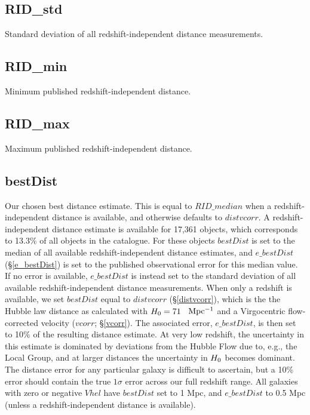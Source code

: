 \subsection{RID\_std} \label{RID_std}
Standard deviation of all redshift-independent distance measurements.

\subsection{RID\_min} \label{RID_min}
Minimum published redshift-independent distance.

\subsection{RID\_max} \label{RID_max}
Maximum published redshift-independent distance.

\subsection{bestDist} \label{bestDist}
Our chosen best distance estimate. This is equal to $RID\_median$ when a redshift-independent distance is available, and otherwise defaults to $distvcorr$. A redshift-independent distance estimate is available for 17,361 objects, which corresponds to 13.3\% of all objects in the catalogue. For these objects $bestDist$ is set to the median of all available redshift-independent distance estimates, and $e\_bestDist$ (\S \ref{e_bestDist}) is set to the published observational error for this median value. If no error is available, $e\_bestDist$ is instead set to the standard deviation of all available redshift-independent distance measurements. When only a redshift is available, we set $bestDist$ equal to $distvcorr$ (\S \ref{distvcorr}), which is the the Hubble law distance as calculated with $H_{\rm 0} = 71$ \kms~$\rm Mpc^{-1}$ and a Virgocentric flow-corrected velocity ($vcorr$; \S \ref{vcorr}). The associated error, $e\_bestDist$, is then set to 10\% of the resulting distance estimate. At very low redshift, the uncertainty in this estimate is dominated by deviations from the Hubble Flow due to, e.g., the Local Group, and at larger distances the uncertainty in $H_{\rm 0}$ becomes dominant. The distance error for any particular galaxy is difficult to ascertain, but a 10\% error should contain the true $1\sigma$ error across our full redshift range. All galaxies with zero or negative $Vhel$ have $bestDist$ set to 1 Mpc, and $e\_bestDist$ to 0.5 Mpc (unless a redshift-independent distance is available). 

